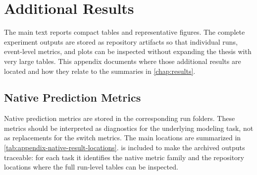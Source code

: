 \chapter{Additional Results}
\label{app:additional-results}

The main text reports compact tables and representative figures. The complete
experiment outputs are stored as repository artifacts so that individual runs,
event-level metrics, and plots can be inspected without expanding the thesis
with very large tables. This appendix documents where those additional results
are located and how they relate to the summaries in \cref{chap:results}.

\section{Native Prediction Metrics}
\label{app:native-prediction-metrics}

Native prediction metrics are stored in the corresponding run folders. These
metrics should be interpreted as diagnostics for the underlying modeling task,
not as replacements for the switch metrics. The main locations are summarized
in \cref{tab:appendix-native-result-locations}.
 is included to make the archived
outputs traceable: for each task it identifies the native metric family and the
repository locations where the full run-level tables can be inspected.

